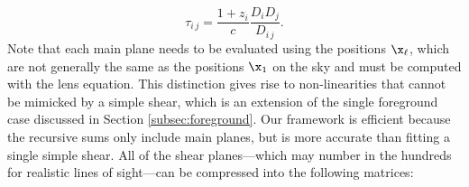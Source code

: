 \begin{equation}
\tau_{i\,j} = \frac{ 1 + z_i}{c} \frac{D_i D_j}{D_{i\,j}}.
\end{equation}
Note that each main plane needs to be evaluated using the positions $\x_\ell$, which are not generally the same as the positions $\x_1$ on the sky and must be computed with the lens equation. This distinction gives rise to non-linearities that cannot be mimicked by a simple shear, which is an extension of the single foreground case discussed in Section \ref{subsec:foreground}. Our framework is efficient because the recursive sums only include main planes, but is more accurate than fitting a single simple shear. All of the shear planes---which may number in the hundreds for realistic lines of sight---can be compressed into the following matrices:
  